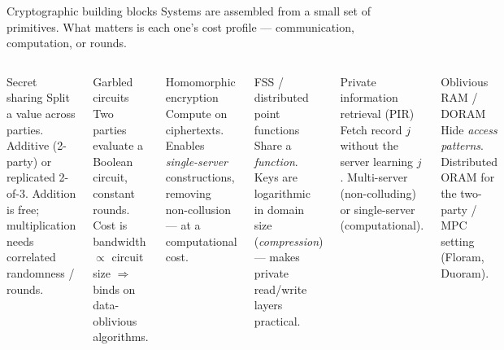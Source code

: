 \documentclass[10pt,aspectratio=169]{beamer}
\begin{document}
\begin{frame}{Cryptographic building blocks}
  Systems are assembled from a small set of primitives. What matters is each
  one's \alert{cost profile} --- communication, computation, or rounds.
 
  \vspace{0.3em}
  \begin{columns}[T]
    \begin{block}{Secret sharing}
      \footnotesize Split a value across parties. Additive (2-party) or replicated
      2-of-3. Addition is free; multiplication needs correlated randomness / rounds.
    \end{block}
    \begin{block}{Garbled circuits}
      \footnotesize Two parties evaluate a Boolean circuit, constant rounds.
      Cost is bandwidth $\propto$ circuit size $\Rightarrow$ binds on data-oblivious algorithms.
    \end{block}
    \begin{block}{Homomorphic encryption}
      \footnotesize Compute on ciphertexts. Enables \emph{single-server} constructions,
      removing non-collusion --- at a computational cost.
    \end{block}
    \begin{block}{FSS / distributed point functions}
      \footnotesize Share a \emph{function}. Keys are logarithmic in domain size
      (\emph{compression}) --- makes private read/write layers practical.
    \end{block}
    \begin{block}{Private information retrieval (PIR)}
      \footnotesize Fetch record $j$ without the server learning $j$.
      Multi-server (non-colluding) or single-server (computational).
    \end{block}
    \begin{block}{Oblivious RAM / DORAM}
      \footnotesize Hide \emph{access patterns}. Distributed ORAM for the
      two-party / MPC setting (Floram, Duoram).
    \end{block}
  \end{columns}
\end{frame}
 
\end{document}
